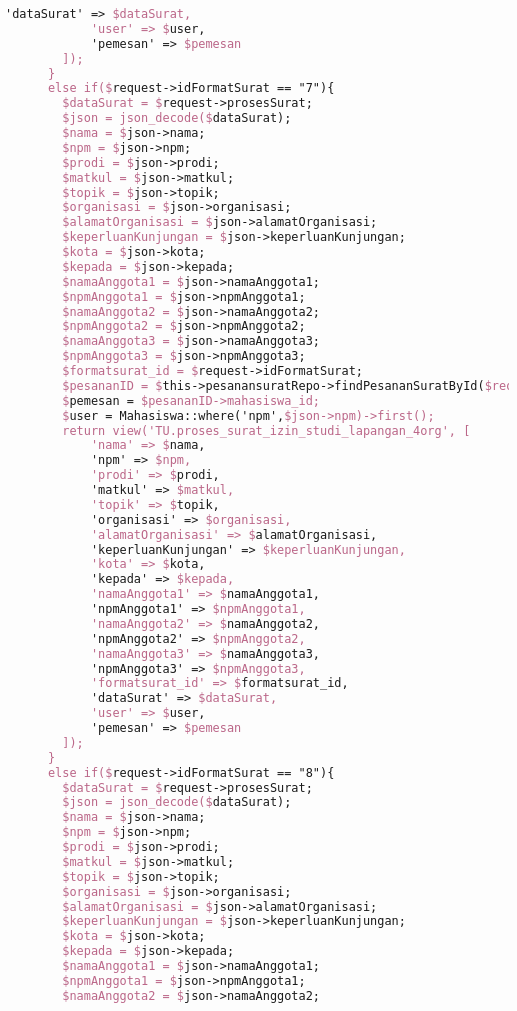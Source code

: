 \begin{lstlisting}[language=tex,basicstyle=\tiny,caption=PesanansuratController.php]
            'dataSurat' => $dataSurat,
            'user' => $user,
            'pemesan' => $pemesan
        ]);
      }
      else if($request->idFormatSurat == "7"){
        $dataSurat = $request->prosesSurat;
        $json = json_decode($dataSurat);
        $nama = $json->nama;
        $npm = $json->npm;
        $prodi = $json->prodi;
        $matkul = $json->matkul;
        $topik = $json->topik;
        $organisasi = $json->organisasi;
        $alamatOrganisasi = $json->alamatOrganisasi;
        $keperluanKunjungan = $json->keperluanKunjungan;
        $kota = $json->kota;
        $kepada = $json->kepada;
        $namaAnggota1 = $json->namaAnggota1;
        $npmAnggota1 = $json->npmAnggota1;
        $namaAnggota2 = $json->namaAnggota2;
        $npmAnggota2 = $json->npmAnggota2;
        $namaAnggota3 = $json->namaAnggota3;
        $npmAnggota3 = $json->npmAnggota3;
        $formatsurat_id = $request->idFormatSurat;
        $pesananID = $this->pesanansuratRepo->findPesananSuratById($request->id);
        $pemesan = $pesananID->mahasiswa_id;
        $user = Mahasiswa::where('npm',$json->npm)->first();
        return view('TU.proses_surat_izin_studi_lapangan_4org', [
            'nama' => $nama,
            'npm' => $npm,
            'prodi' => $prodi,
            'matkul' => $matkul,
            'topik' => $topik,
            'organisasi' => $organisasi,
            'alamatOrganisasi' => $alamatOrganisasi,
            'keperluanKunjungan' => $keperluanKunjungan,
            'kota' => $kota,
            'kepada' => $kepada,
            'namaAnggota1' => $namaAnggota1,
            'npmAnggota1' => $npmAnggota1,
            'namaAnggota2' => $namaAnggota2,
            'npmAnggota2' => $npmAnggota2,
            'namaAnggota3' => $namaAnggota3,
            'npmAnggota3' => $npmAnggota3,
            'formatsurat_id' => $formatsurat_id,
            'dataSurat' => $dataSurat,
            'user' => $user,
            'pemesan' => $pemesan
        ]);
      }
      else if($request->idFormatSurat == "8"){
        $dataSurat = $request->prosesSurat;
        $json = json_decode($dataSurat);
        $nama = $json->nama;
        $npm = $json->npm;
        $prodi = $json->prodi;
        $matkul = $json->matkul;
        $topik = $json->topik;
        $organisasi = $json->organisasi;
        $alamatOrganisasi = $json->alamatOrganisasi;
        $keperluanKunjungan = $json->keperluanKunjungan;
        $kota = $json->kota;
        $kepada = $json->kepada;
        $namaAnggota1 = $json->namaAnggota1;
        $npmAnggota1 = $json->npmAnggota1;
        $namaAnggota2 = $json->namaAnggota2;

\end{lstlisting}
